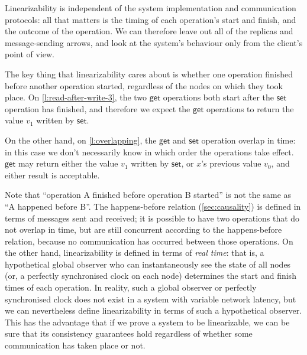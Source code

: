 Linearizability is independent of the system implementation and communication protocols: all that matters is the timing of each operation's start and finish, and the outcome of the operation.
We can therefore leave out all of the replicas and message-sending arrows, and look at the system's behaviour only from the client's point of view.

The key thing that linearizability cares about is whether one operation finished before another operation started, regardless of the nodes on which they took place.
On \autoref{l:read-after-write-3}, the two $\mathsf{get}$ operations both start after the $\mathsf{set}$ operation has finished, and therefore we expect the $\mathsf{get}$ operations to return the value $v_1$ written by $\mathsf{set}$.

On the other hand, on \autoref{l:overlapping}, the $\mathsf{get}$ and $\mathsf{set}$ operation overlap in time: in this case we don't necessarily know in which order the operations take effect.
$\mathsf{get}$ may return either the value $v_1$ written by $\mathsf{set}$, or $x$'s previous value $v_0$, and either result is acceptable.

Note that ``operation A finished before operation B started'' is not the same as ``A happened before B''.
The happens-before relation (\autoref{sec:causality}) is defined in terms of messages sent and received; it is possible to have two operations that do not overlap in time, but are still concurrent according to the happens-before relation, because no communication has occurred between those operations.
On the other hand, linearizability is defined in terms of \emph{real time}: that is, a hypothetical global observer who can instantaneously see the state of all nodes (or, a perfectly synchronised clock on each node) determines the start and finish times of each operation.
In reality, such a global observer or perfectly synchronised clock does not exist in a system with variable network latency, but we can nevertheless define linearizability in terms of such a hypothetical observer.
This has the advantage that if we prove a system to be linearizable, we can be sure that its consistency guarantees hold regardless of whether some communication has taken place or not.


